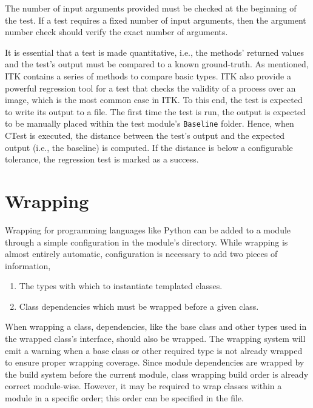 The number of input arguments provided must be checked at the beginning of the
test. If a test requires a fixed number of input arguments, then the argument
number check should verify the exact number of arguments.

It is essential that a test is made quantitative, i.e., the methods' returned
values and the test's output must be compared to a known ground-truth. As
mentioned, ITK contains a series of methods to compare basic types. ITK also
provide a powerful regression tool for a test that checks the validity of a
process over an image, which is the most common case in ITK. To this end, the
test is expected to write its output to a file. The first time the test is run,
the output is expected to be manually placed within the test module's
\texttt{Baseline} folder. Hence, when CTest is executed, the distance between
the test's output and the expected output (i.e., the baseline) is computed. If
the distance is below a configurable tolerance, the regression test is marked as
a success.

\section{Wrapping}%
\label{sec:ModuleWrapping}%

Wrapping for programming languages like Python can be added to a module
through a simple configuration in the module's  directory.
While wrapping is almost entirely automatic, configuration is necessary
to add two pieces of information,

\begin{enumerate}
  \item The types with which to instantiate templated classes.
  \item Class dependencies which must be wrapped before a given class.
\end{enumerate}

When wrapping a class, dependencies, like the base class and other types used
in the wrapped class's interface, should also be wrapped. The wrapping system
will emit a warning when a base class or other required type is not already
wrapped to ensure proper wrapping coverage. Since module dependencies are
wrapped by the build system before the current module, class wrapping
build order is already correct module-wise. However, it may be required to
wrap classes within a module in a specific order; this order can be specified
in the  file.


